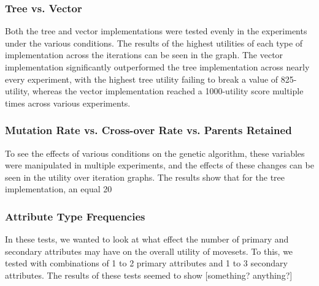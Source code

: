\documentclass{acm_proc_article-sp}
\begin{document}
\subsubsection{Tree vs. Vector}
Both the tree and vector implementations were tested evenly in the experiments under the various conditions. The results of the highest utilities of each type of implementation across the iterations can be seen in the graph. The vector implementation significantly outperformed the tree implementation across nearly every experiment, with the highest tree utility failing to break a value of 825-utility, whereas the vector implementation reached a 1000-utility score multiple times across various experiments.  
\subsubsection{Mutation Rate vs. Cross-over Rate vs. Parents Retained}
To see the effects of various conditions on the genetic algorithm, these variables were manipulated in multiple experiments, and the effects of these changes can be seen in the utility over iteration graphs. The results show that for the tree implementation, an equal 20%
\subsubsection{Attribute Type Frequencies}
In these tests, we wanted to look at what effect the number of primary and secondary attributes may have on the overall utility of movesets. To this, we tested with combinations of 1 to 2 primary attributes and 1 to 3 secondary attributes. The results of these tests seemed to show [something? anything?]

\end{document}
